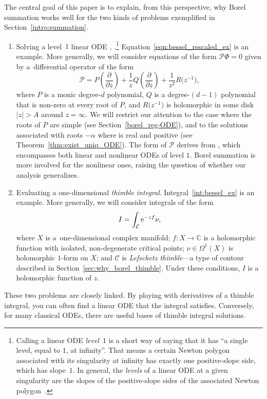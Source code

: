 \documentclass[10pt,a4paper]{amsart}
\newcommand{\maps}{\colon}
\newcommand{\C}{\mathbb{C}}
\numberwithin{equation}{section}
\begin{document}
The central goal of this paper is to explain, from this perspective, why Borel summation works well for the two kinds of problems exemplified in Section~\ref{intro:summation}.
\begin{enumerate}\itemsep=0pt
\item[(1)] Solving a level~$1$ linear ODE \cite[Section 2.1]{EcalleIII}, \cite[Section~5.2.2.1]{diverg-resurg-iii}.\footnote{Calling a linear ODE {\em level~$1$} is a short way of saying that it has ``a single level, equal to $1$, at infinity''. That means a certain Newton polygon associated with its singularity at infinity has exactly one positive-slope side, which has slope~$1$. In general, the {\em levels} of a linear ODE at a given singularity are the slopes of the positive-slope sides of the associated Newton polygon~\cite[Proposition~3.3.14]{diverg-resurg--ii}.} Equation~\eqref{eqn:bessel_rescaled_ex} is an example. More generally, we will consider equations of the form $\mathcal{P} \Phi = 0$ given by a~differential operator of the form
\[ \mathcal{P} = P\left(\frac{\partial}{\partial z}\right) + \frac{1}{z} Q\left(\frac{\partial}{\partial z}\right) + \frac{1}{z^2} R\bigl(z^{-1}\bigr), \]
where $P$ is a monic degree-$d$ polynomial, $Q$ is a degree-$(d-1)$ polynomial that is non-zero at every root of $P$, and $R\bigl(z^{-1}\bigr)$ is holomorphic in some disk $|z| > A$ around $z = \infty$. We will restrict our attention to the case where the roots of $P$ are simple (see Section~\ref{borel_reg-ODE}), and to the solutions associated with roots $-\alpha$ where  is real and positive (see Theorem~\ref{thm:exist_uniq_ODE}).
The form of $\mathcal{P}$ derives from \cite[equation~(2.2.3), p.~105]{EcalleIII}, which encompasses both linear and nonlinear ODEs of level $1$. Borel summation is more involved for the nonlinear ones, raising the question of whether our analysis generalizes.
%
\item[(2)] Evaluating a one-dimensional {\em thimble integral}. Integral~\eqref{int:bessel_ex} is an example. More generally, we will consider integrals of the form
\[
I = \int_{\mathcal{C}}{\rm e}^{-zf} \nu,
\]
where $X$ is a~one-dimensional complex manifold; $f \maps X \to \C$ is a holomorphic function with isolated, non-degenerate critical points; $\nu \in \Omega^1(X)$ is holomorphic $1$-form on $X$; and $\mathcal{C}$ is {\em Lefschetz thimble}---a type of contour described in Section~\ref{sec:why_borel_thimble}. Under these conditions, $I$ is a holomorphic function of $z$.
\end{enumerate}
These two problems are closely linked. By playing with derivatives of a thimble integral, you can often find a linear ODE that the integral satisfies. Conversely, for many classical ODEs, there are useful bases of thimble integral solutions.
%
\end{document}
